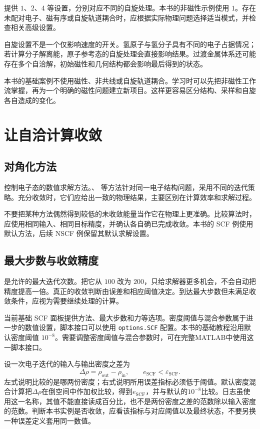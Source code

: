  提供 $1$、$2$、$4$ 等设置，分别对应不同的自旋处理。本书的非磁性示例使用 $1$。存在未配对电子、磁有序或自旋轨道耦合时，应根据实际物理问题选择适当模式，并检查相关高级设置。

自旋设置不是一个仅影响速度的开关。氢原子与氢分子具有不同的电子占据情况；若计算分子解离能，原子参考态的自旋处理会直接影响结果。过渡金属体系还可能存在多个自洽解，初始磁性和几何结构都会影响最后得到的状态。

本书的基础案例不使用磁性、非共线或自旋轨道耦合。学习时可以先把非磁性工作流掌握，再为一个明确的磁性问题建立新项目。这样更容易区分结构、采样和自旋各自造成的变化。

\section{让自洽计算收敛}

\subsection{对角化方法}

 控制电子态的数值求解方法。、 等方法针对同一电子结构问题，采用不同的迭代策略。充分收敛时，它们应给出一致的物理结果，主要区别在计算效率和求解过程。

不要把某种方法偶然得到较低的未收敛能量当作它在物理上更准确。比较算法时，应使用相同输入、相同目标精度，并确认各自确已完成收敛。本书的 SCF 例使用默认方法，后续 NSCF 例保留其默认求解设置。

\subsection{最大步数与收敛精度}

 是允许的最大迭代次数。把它从 $100$ 改为 $200$，只给求解器更多机会，不会自动把精度提高一倍。真正的收敛判断由误差和相应阈值决定。到达最大步数但未满足收敛条件，应视为需要继续处理的计算。

当前基础 SCF 面板提供方法、最大步数和力等选项。密度阈值与混合参数属于进一步的数值设置，脚本接口可以使用 \texttt{options.SCF} 配置。本书的基础教程沿用默认密度阈值 $10^{-8}$。需要调整密度阈值与混合参数时，可在完整MATLAB\regmark{}中使用这一脚本接口。


设一次电子迭代的输入与输出密度之差为
\begin{equation}
  \Delta\rho=\rho_{\mathrm{out}}-\rho_{\mathrm{in}},
  \qquad e_{\mathrm{SCF}}<\varepsilon_{\mathrm{SCF}}.
  \label{eq:scf-stopping}
\end{equation}
左式说明比较的是哪两份密度；右式说明所用误差指标必须低于阈值。默认密度混合计算把$\Delta\rho$在倒空间中作加权比较，得到$e_{\mathrm{SCF}}$，并与默认的$10^{-8}$比较。日志虽使用这一名称，其值不能直接读成百分比，也不是两份密度之差的范数除以输入密度的范数。判断本书实例是否收敛，应看该指标与对应阈值以及最终状态，不要另换一种误差定义套用同一数值。

